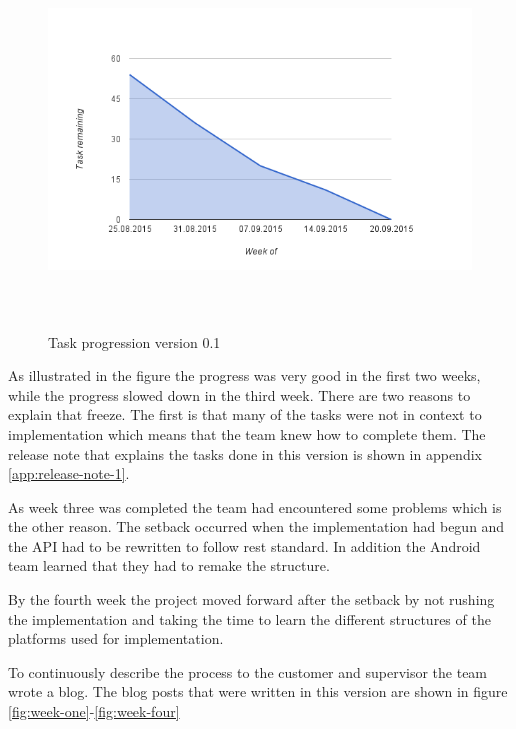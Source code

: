 \begin{figure}
\centering
\includegraphics[height=10cm]{figs/v01/progressv1.png}
\caption{Task progression version 0.1}
\label{fig:progress-v1}
\end{figure}


As illustrated in the figure the progress was very good in the first two weeks, while the progress slowed down in the third week. There are two reasons to explain that freeze. The first is that many of the tasks were not in context to implementation which means that the team knew how to complete them. The release note that explains the tasks done in this version is shown in appendix \ref{app:release-note-1}.

As week three was completed the team had encountered some problems which is the other reason. The setback occurred when the implementation had begun and the \gls{API} had to be rewritten to follow rest standard. In addition the Android team learned that they had to remake the structure. 

By the fourth week the project moved forward after the setback by not rushing the implementation and taking the time to learn the different structures of the platforms used for implementation. 

To continuously describe the process to the customer and supervisor the team wrote a blog. The blog posts that were written in this version are shown in figure \ref{fig:week-one}-\ref{fig:week-four}

